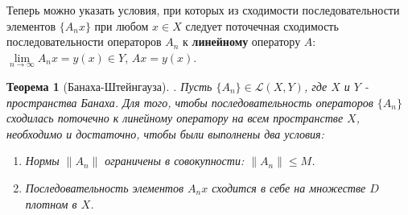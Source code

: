 \documentclass[12pt,a4paper,titlepage]{book}
\theoremstyle{definition}
\theoremstyle{plain}
\newtheorem{theorem}{Теорема}
\theoremstyle{remark}
\theoremstyle{plain}
\begin{document}
Теперь можно указать условия, при которых из сходимости последовательности элементов $\lbrace A_n x\rbrace$ при любом $x \in X$ следует поточечная сходимость последовательности операторов $A_n$ к \textbf{линейному} оператору $A$: $\lim\limits_{n \to \infty}A_n x = y(x) \in Y$, $Ax=y(x)$.

\begin{theorem}[Банаха-Штейнгауза].
Пусть $\lbrace A_n\rbrace \in \mathcal{L}(X,Y)$, где $X$ и $Y$ - пространства Банаха. Для того, чтобы последовательность операторов $\lbrace A_n\rbrace$ сходилась поточечно к линейному оператору на всем пространстве $X$, необходимо и достаточно, чтобы были выполнены два условия:

\begin{enumerate}
\item Нормы $\lVert A_n\rVert$ ограничены в совокупности: $\lVert A_n\rVert \le M$.
\item Последовательность элементов $A_n x$ сходится в себе на множестве $D$ плотном в $X$.
\end{enumerate}
\end{theorem}
\end{document}
